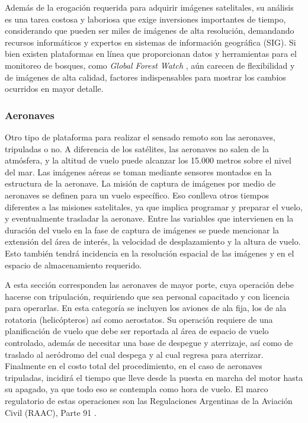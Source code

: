 Además de la erogación requerida para adquirir imágenes satelitales, su análisis es una tarea costosa y laboriosa que exige inversiones importantes de tiempo, considerando que pueden ser miles de imágenes de alta resolución, demandando recursos informáticos y expertos en sistemas de información geográfica (SIG). Si bien existen plataformas en línea que proporcionan datos y herramientas para el monitoreo de bosques, como \textit{Global Forest Watch} \cite{vizzuality_forest_nodate}, aún carecen de flexibilidad y de imágenes de alta calidad, factores indispensables para mostrar los cambios ocurridos en mayor detalle.


\subsubsection{Aeronaves}
Otro tipo de plataforma para realizar el sensado remoto son las aeronaves, tripuladas o no. A diferencia de los satélites, las aeronaves no salen de la atmósfera, y la altitud de vuelo puede alcanzar los 15.000 metros sobre el nivel del mar. Las imágenes aéreas se toman mediante sensores montados en la estructura de la aeronave. La misión de captura de imágenes por medio de aeronaves se definen para un vuelo específico. Eso conlleva otros tiempos diferentes a las misiones satelitales, ya que implica programar y preparar el vuelo, y eventualmente trasladar la aeronave. Entre las variables que intervienen en la duración del vuelo en la fase de captura de imágenes se puede mencionar la extensión del área de interés, la velocidad de desplazamiento y la altura de vuelo. Esto también tendrá incidencia en la resolución espacial de las imágenes y en el espacio de almacenamiento requerido.

A esta sección corresponden las aeronaves de mayor porte, cuya operación debe hacerse con tripulación, requiriendo que sea personal capacitado y con licencia para operarlas. En esta categoría se incluyen los aviones de ala fija, los de ala rotatoria (helicópteros) así como aerostatos. Su operación requiere de una planificación de vuelo que debe ser reportada al área de espacio de vuelo controlado, además de necesitar una base de despegue y aterrizaje, así como de traslado al aeródromo del cual despega y al cual regresa para aterrizar.   Finalmente en el costo total del procedimiento, en el caso de aeronaves tripuladas, incidirá el tiempo que lleve desde la puesta en marcha del motor hasta su apagado, ya que todo eso se contempla como hora de vuelo.
El marco regulatorio de estas operaciones son las Regulaciones Argentinas de la Aviación Civil (RAAC), Parte 91 \cite{noauthor_infoleg_nodate-1}. 


